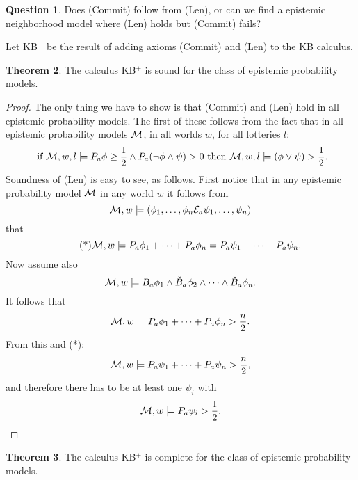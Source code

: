 \documentclass[12pt]{article}
\newcommand{\XXXcomment}[1]{}
\newcommand{\XXXcomment}[1]{\marginpar{\color{blue}{\footnotesize #1}}}
\theoremstyle{definition}
\newtheorem{theorem}{Theorem}[section]
\newtheorem{question}[theorem]{Question}
\newcommand{\M}{{\cal M}}      %
\begin{document}
\begin{question} 
Does (Commit) follow from (Len), or can we find a epistemic neighborhood model
where (Len) holds but (Commit) fails? 
\end{question}
\XXXcomment{We should try to answer this!}

Let KB$^{+}$ be the result of adding axioms (Commit) and  (Len) to the KB calculus. 

\begin{theorem} \label{sound+EPM}
The calculus KB$^{+}$ is sound for the class of epistemic probability models.
\end{theorem}
\begin{proof}
The only thing we have to show is that (Commit) and (Len) hold in all epistemic probability 
models. The first of these follows from the fact that in all epistemic probability 
models $\M$, in all worlds $w$, for all lotteries $l$:
\[
  \text{ if } \M,w,l \models P_a \phi \geq \frac 1 2 \land 
      P_a (\neg \phi \land \psi) > 0
  \text{ then } \M, w, l \models  (\phi \lor \psi) > \frac 1 2. 
\]
Soundness of (Len) is easy to see, as follows. First notice that in any epistemic 
probability model $\M$ in any world $w$ it follows from 
\[
  \M, w \models (\phi_1, \ldots, \phi_n {\cal E}_a \psi_1, \ldots, \psi_n)
\]
that
\[ \tag{*}
   \M, w \models P_a \phi_1 + \cdots + P_a \phi_n = P_a \psi_1 + \cdots + P_a \psi_n. 
\]
Now assume also
\[
  \M, w \models B_a \phi_1 \land \check{B}_a \phi_2
      \land  \cdots \land\check{B}_a \phi_n. 
\]
It follows that
\[
  \M, w \models  P_a \phi_1 + \cdots + P_a \phi_n > \frac n 2. 
\]
From this and (*): 
\[
   \M, w \models  P_a \psi_1 + \cdots + P_a \psi_n > \frac n 2, 
\]
and therefore there has to be at least one $\psi_i$ with 
\[
  \M, w \models P_a \psi_i > \frac 1 2. 
\]
\end{proof}

\begin{theorem} \label{completeEPM}
The calculus KB$^{+}$ is complete for the class of epistemic probability models.
\end{theorem}
\end{document}
